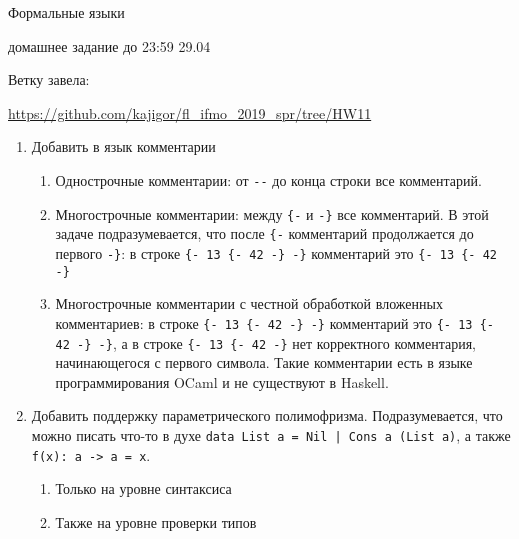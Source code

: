 \documentclass[12pt]{article}
\begin{document}
\begin{center}
\LARGE {Формальные языки}

\Large {домашнее задание до 23:59 29.04}
\end{center} 

\bigskip

Ветку завела: 

\url{https://github.com/kajigor/fl\_ifmo\_2019\_spr/tree/HW11}

\begin{enumerate}
  \item Добавить в язык комментарии
  
  \begin{enumerate}
      \item Однострочные комментарии: от \verb!--! до конца строки все комментарий.
  
      \item Многострочные комментарии: между \verb!{-! и \verb!-}! все комментарий. В этой задаче подразумевается, что после \verb!{-! комментарий продолжается до первого \verb!-}!: в строке \verb!{- 13 {- 42 -} -}! комментарий это \verb!{- 13 {- 42 -}!
  
      \item Многострочные комментарии с честной обработкой вложенных комментариев: в строке \verb!{- 13 {- 42 -} -}! комментарий это \verb!{- 13 {- 42 -} -}!, а в строке \verb!{- 13 {- 42 -}! нет корректного комментария, начинающегося с первого символа. Такие комментарии есть в языке программирования OCaml и не существуют в Haskell.
  \end{enumerate}
  
  \item Добавить поддержку параметрического полимофризма. Подразумевается, что можно писать что-то в духе \verb!data List a = Nil | Cons a (List a)!, а также \verb!f(x): a -> a = x!. 
  
  \begin{enumerate}
      \item Только на уровне синтаксиса
  
      \item Также на уровне проверки типов
  \end{enumerate}
\end{enumerate}
\end{document}
